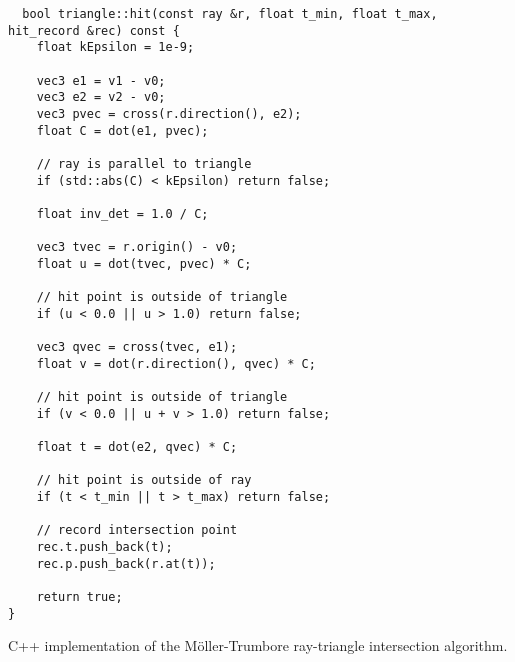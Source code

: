 \begin{listing}
\begin{verbatim}
  bool triangle::hit(const ray &r, float t_min, float t_max, hit_record &rec) const {
    float kEpsilon = 1e-9;

    vec3 e1 = v1 - v0;
    vec3 e2 = v2 - v0;
    vec3 pvec = cross(r.direction(), e2);
    float C = dot(e1, pvec);

    // ray is parallel to triangle
    if (std::abs(C) < kEpsilon) return false; 

    float inv_det = 1.0 / C;

    vec3 tvec = r.origin() - v0;
    float u = dot(tvec, pvec) * C;

    // hit point is outside of triangle
    if (u < 0.0 || u > 1.0) return false;

    vec3 qvec = cross(tvec, e1);
    float v = dot(r.direction(), qvec) * C;

    // hit point is outside of triangle
    if (v < 0.0 || u + v > 1.0) return false;

    float t = dot(e2, qvec) * C;

    // hit point is outside of ray
    if (t < t_min || t > t_max) return false;

    // record intersection point
    rec.t.push_back(t); 
    rec.p.push_back(r.at(t));

    return true;
}
\end{verbatim}
\caption{C++ implementation of the Möller-Trumbore ray-triangle intersection algorithm.}
\label{list:tri_intersect_alg}
\end{listing}
  






